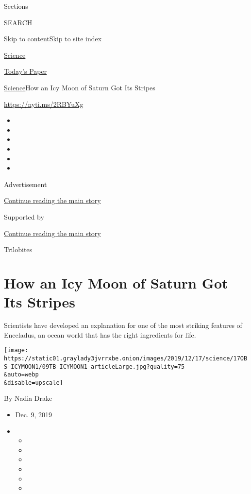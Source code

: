 Sections

SEARCH

\protect\hyperlink{site-content}{Skip to
content}\protect\hyperlink{site-index}{Skip to site index}

\href{https://www.nytimes3xbfgragh.onion/section/science}{Science}

\href{https://myaccount.nytimes3xbfgragh.onion/auth/login?response_type=cookie\&client_id=vi}{}

\href{https://www.nytimes3xbfgragh.onion/section/todayspaper}{Today's
Paper}

\href{/section/science}{Science}\textbar{}How an Icy Moon of Saturn Got
Its Stripes

\url{https://nyti.ms/2RBYuXg}

\begin{itemize}
\item
\item
\item
\item
\item
\item
\end{itemize}

Advertisement

\protect\hyperlink{after-top}{Continue reading the main story}

Supported by

\protect\hyperlink{after-sponsor}{Continue reading the main story}

Trilobites

\hypertarget{how-an-icy-moon-of-saturn-got-its-stripes}{%
\section{How an Icy Moon of Saturn Got Its
Stripes}\label{how-an-icy-moon-of-saturn-got-its-stripes}}

Scientists have developed an explanation for one of the most striking
features of Enceladus, an ocean world that has the right ingredients for
life.

\texttt{[image: https://static01.graylady3jvrrxbe.onion/images/2019/12/17/science/17OBS-ICYMOON1/09TB-ICYMOON1-articleLarge.jpg?quality=75\\\&auto=webp\\\&disable=upscale]}

By Nadia Drake

\begin{itemize}
\item
  Dec. 9, 2019
\item
  \begin{itemize}
  \item
  \item
  \item
  \item
  \item
  \item
  \end{itemize}
\end{itemize}

